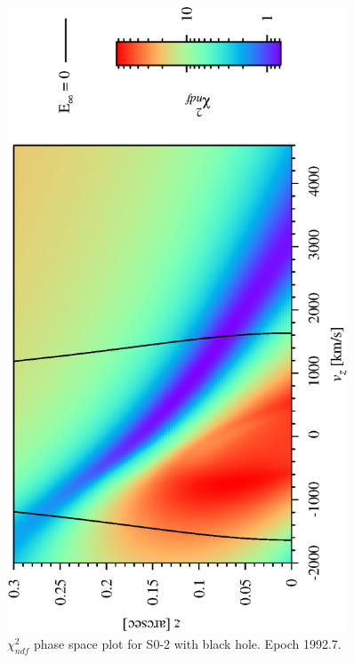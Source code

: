 \begin{figure}[!pt]
	\begin{center}
	\includegraphics[angle=-90,width=0.9\textwidth]{eps/so2-BH-run2.eps}
	\caption{$\chi^2_{ndf}$ phase space plot for S0-2 with black hole. Epoch 1992.7.}
	\label{fig_so2BHphasespace}
	\end{center}
\end{figure}
